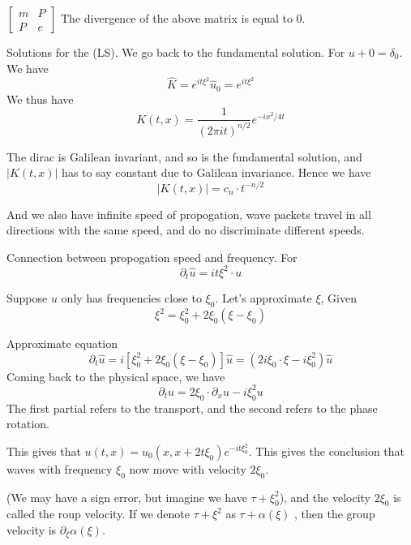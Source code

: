 $\begin{bmatrix}
    m & P \\
    P & e
\end{bmatrix}$
The divergence of the above matrix is equal to 0.

Solutions for the (LS).
We go back to the fundamental solution. For $u+0=\delta_0$. We have
\begin{equation*}
    \widehat{K}=e^{it\xi^2}\widehat{u}_0=e^{it\xi^2}
\end{equation*}
We thus have
\begin{equation*}
    K(t,x)=\frac{1}{(2\pi it)^{n/2}}e^{-ix^2/4t}
\end{equation*}

The dirac is Galilean invariant, and so is the fundamental solution, and $|K(t,x)|$ has to say constant due to Galilean invariance. Hence we have
\begin{equation*}
    |K(t,x)|=c_n\cdot t^{-n/2}
\end{equation*}

And we also have infinite speed of propogation, wave packets travel in all directions with the same speed, and do no discriminate different speeds.

Connection between propogation speed and frequency.
For
\begin{equation*}
    \partial_t\widehat{u}=it\xi^2\cdot u
\end{equation*}

Suppose $u$ only has frequencies close to $\xi_0$. Let's approximate $\xi$, Given
\begin{equation*}
    \xi^2=\xi_0^2+2\xi_0(\xi-\xi_0)
\end{equation*}

Approximate equation
\begin{equation*}
    \partial_t\widehat{u}=i[\xi_0^2+2\xi_0(\xi-\xi_0)]\widehat{u}=(2i\xi_0\cdot\xi-i\xi_0^2)\widehat{u}
\end{equation*}
Coming back to the physical space, we have
\begin{equation*}
    \partial_t{u}=2\xi_0\cdot\partial_xu-i\xi_0^2u
\end{equation*}
The first partial refers to the transport, and the second refers to the phase rotation.

This gives that $u(t,x)=u_0(x,x+2t\xi_0)e^{-it\xi_0^2}$. This gives the conclusion that waves with frequency $\xi_0$ now move with velocity $2\xi_0$.

(We may have a sign error, but imagine we have $\tau+\xi_0^2$), and the velocity $2\xi_0$ is called the roup velocity. If we denote $\tau+\xi^2$ as $\tau+\alpha(\xi)$ , then the group velocity is $\partial_\xi\alpha(\xi)$.

